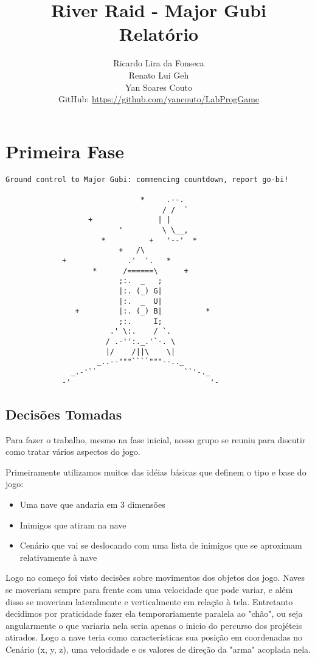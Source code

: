 \documentclass[12pt,a4paper]{article}
\title{\vspace{-130pt}
River Raid - Major Gubi \\
		Relatório}
\author{Ricardo Lira da Fonseca\\Renato Lui Geh\\Yan Soares Couto\\GitHub: \url{https://github.com/yancouto/LabProgGame}}
\date{}
\begin{document}
	\maketitle
	\section{Primeira Fase}
	\begin{verbatim}
Ground control to Major Gubi: commencing countdown, report go-bi!

                               *     .--.
                                    / /  `
                   +               | |
                          '         \ \__,
                      *          +   '--'  *
                          +   /\
             +              .'  '.   *
                    *      /======\      +
                          ;:.  _   ;
                          |:. (_) G|
                          |:.  _  U|
                +         |:. (_) B|          *
                          ;:.     I;
                        .' \:.    / `.
                       / .-'':._.'`-. \
                       |/    /||\    \|
                     _..--"""````"""--.._
               _.-'``                    ``'-._
             -'                                '-
	\end{verbatim}
		\subsection{Decisões Tomadas}
		Para fazer o trabalho, mesmo na fase inicial, nosso grupo se reuniu para discutir como tratar vários 					aspectos do jogo.
	
	  	Primeiramente utilizamos muitos das idéias básicas que definem o tipo e base do jogo:
	  	\begin{itemize}
	  		\item Uma nave que andaria em 3 dimensões
	  		\item Inimigos que atiram na nave
	  		\item Cenário que vai se deslocando com uma lista de inimigos que se aproximam relativamente à nave
	  	\end{itemize}
	  	Logo no começo foi visto decisões sobre movimentos dos objetos dos jogo. Naves se moveriam
		sempre para frente com uma velocidade que pode variar, e além disso se moveriam lateralmente
		e verticalmente em relação à tela. Entretanto decidimos por praticidade fazer ela temporariamente
		paralela ao "chão", ou seja angularmente o que variaria nela seria apenas o inicio do percurso
		dos projéteis atirados. Logo a nave teria como características sua posição em coordenadas no
		Cenário (x, y, z), uma velocidade e os valores de direção da "arma" acoplada nela.\\
		
\end{document}
